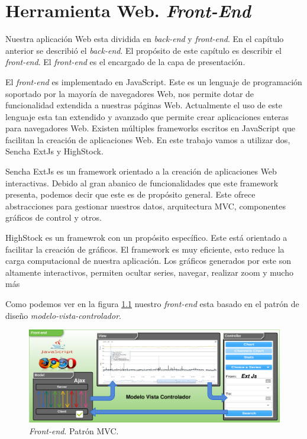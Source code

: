 \chapter{Herramienta Web. \emph{Front-End}}
\label{frontend}
Nuestra aplicación Web esta dividida en \emph{back-end} y \emph{front-end}. En el capítulo anterior se describió el \emph{back-end}. El propósito de
este capítulo es describir el \emph{front-end}. El \emph{front-end} es el encargado de la capa de presentación.
\par
El \emph{front-end} es implementado en JavaScript\cite{JavaScript}. Este es un lenguaje de programación soportado por la mayoría de navegadores Web,
nos permite dotar de funcionalidad extendida a nuestras páginas Web. Actualmente el uso de este lenguaje esta tan extendido y avanzado que permite
crear aplicaciones enteras para navegadores Web. Existen múltiples frameworks escritos en JavaScript que facilitan la creación de aplicaciones Web. En
este trabajo vamos a utilizar dos, Sencha ExtJs\cite{ExtJs} y HighStock\cite{HighStock}.
\par
Sencha ExtJs es un framework orientado a la creación de aplicaciones Web interactivas. Debido al gran abanico de funcionalidades que este framework
presenta, podemos decir que este es de propósito general. Este ofrece abstracciones para gestionar nuestros datos, arquitectura MVC, componentes
gráficos de control y otros.
\par
HighStock es un framewrok con un propósito específico. Este está orientado a facilitar la creación de gráficos. El framework es muy eficiente, esto
reduce la carga computacional de nuestra aplicación. Los gráficos generados por este son altamente interactivos, permiten ocultar series, navegar,
realizar zoom y mucho más
\par
Como podemos ver en la figura \ref{fig:frontend} nuestro \emph{front-end} esta basado en el patrón de diseño 
\emph{modelo-vista-controlador}\cite{MVCWiki}.
\begin{figure}[h]
	\centering
	\includegraphics[keepaspectratio, width=1\textwidth]{./img/frontend.png}
	\caption{\emph{Front-end}. Patrón MVC.}   
	\label{fig:frontend}
\end{figure}
